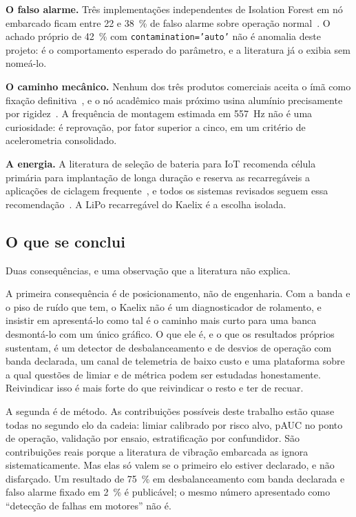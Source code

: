 \documentclass[11pt,a4paper]{article}
\begin{document}
\textbf{O falso alarme.} Três implementações independentes de Isolation Forest em nó
embarcado ficam entre \num{22} e \SI{38}{\percent} de falso alarme sobre operação
normal~\cite{kolok2025,chevtchenko2023}. O achado próprio de \SI{42}{\percent} com
\texttt{contamination='auto'} não é anomalia deste projeto: é o comportamento esperado do
parâmetro, e a literatura já o exibia sem nomeá-lo.

\textbf{O caminho mecânico.} Nenhum dos três produtos comerciais aceita o ímã como fixação
definitiva~\cite{bentlynevada2025,erbessd2025,tractian2022}, e o nó acadêmico mais próximo
usina alumínio precisamente por rigidez~\cite{jakobsen2024}. A frequência de montagem
estimada em \SI{557}{\hertz} não é uma curiosidade: é reprovação, por fator superior a
cinco, em um critério de acelerometria consolidado.

\textbf{A energia.} A literatura de seleção de bateria para IoT recomenda célula primária
para implantação de longa duração e reserva as recarregáveis a aplicações de ciclagem
frequente~\cite{nabavi2025}, e todos os sistemas revisados seguem essa
recomendação~\cite{jakobsen2024,bentlynevada2025,erbessd2025,tractian2022}. A LiPo
recarregável do Kaelix é a escolha isolada.

\subsection{O que se conclui}

Duas consequências, e uma observação que a literatura não explica.

A primeira consequência é de posicionamento, não de engenharia. Com a banda e o piso de
ruído que tem, o Kaelix não é um diagnosticador de rolamento, e insistir em apresentá-lo
como tal é o caminho mais curto para uma banca desmontá-lo com um único gráfico. O que ele
é, e o que os resultados próprios sustentam, é um detector de desbalanceamento e de
desvios de operação com banda declarada, um canal de telemetria de baixo custo e uma
plataforma sobre a qual questões de limiar e de métrica podem ser estudadas honestamente.
Reivindicar isso é mais forte do que reivindicar o resto e ter de recuar.

A segunda é de método. As contribuições possíveis deste trabalho estão quase todas no
segundo elo da cadeia: limiar calibrado por risco alvo, pAUC no ponto de operação,
validação por ensaio, estratificação por confundidor. São contribuições reais porque
a literatura de vibração embarcada as ignora sistematicamente. Mas elas só valem se o
primeiro elo estiver declarado, e não disfarçado. Um resultado de \SI{75}{\percent} em
desbalanceamento com banda declarada e falso alarme fixado em \SI{2}{\percent} é
publicável; o mesmo número apresentado como ``detecção de falhas em motores'' não é.
\end{document}
